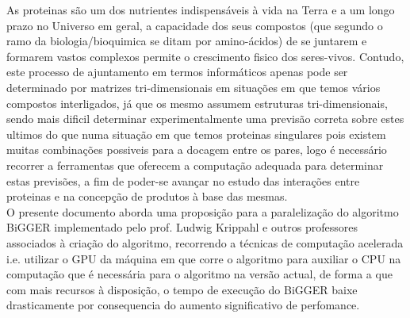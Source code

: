 


%
%
As proteinas são um dos nutrientes indispensáveis à vida na Terra e a um longo prazo no Universo em geral, a capacidade dos seus compostos (que segundo o ramo da biologia/bioquimica se ditam por amino-ácidos) de se juntarem e formarem vastos complexos permite o crescimento fisico dos seres-vivos. 
Contudo, este processo de ajuntamento em termos informáticos apenas pode ser determinado por matrizes tri-dimensionais em situações em que temos vários compostos interligados, já que os mesmo assumem estruturas tri-dimensionais, sendo mais dificil determinar experimentalmente uma previsão correta sobre estes ultimos do que numa situação em que temos proteinas singulares pois existem muitas combinações possiveis para a docagem entre os pares, logo é necessário recorrer a ferramentas que oferecem a computação adequada para determinar estas previsões, a fim de poder-se avançar no estudo das interações entre proteinas e na concepção de produtos à base das mesmas.\\
O presente documento aborda uma proposição para a paralelização do algoritmo BiGGER implementado pelo prof. Ludwig Krippahl e outros professores associados à criação do algoritmo, recorrendo a técnicas de computação acelerada i.e. utilizar o GPU da máquina em que corre o algoritmo para auxiliar o CPU na computação que é necessária para o algoritmo na versão actual, de forma a que com mais recursos à disposição, o tempo de execução do BiGGER baixe drasticamente por consequencia do aumento significativo de perfomance.\\
